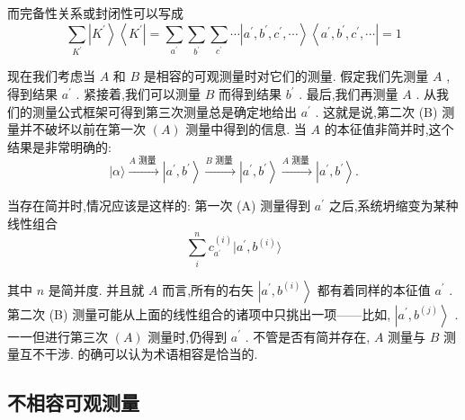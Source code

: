 \documentclass[lang=cn,newtx,10pt,scheme=chinese,thmcnt=section]{elegantbook}
\begin{document}
而完备性关系或封闭性可以写成
\begin{equation}
	\mathop{\sum }\limits_{{K}^{\prime }}\left| {K}^{\prime }\right\rangle \left\langle {K}^{\prime }\right| = \mathop{\sum }\limits_{{a}^{\prime }}\mathop{\sum }\limits_{{b}^{\prime }}\mathop{\sum }\limits_{{c}^{\prime }}\cdots \left| {{a}^{\prime },{b}^{\prime },{c}^{\prime },\cdots }\right\rangle \left\langle {{a}^{\prime },{b}^{\prime },{c}^{\prime },\cdots }\right| = 1
\end{equation}

现在我们考虑当 $A$ 和 $B$ 是相容的可观测量时对它们的测量. 假定我们先测量 $A$ ,得到结果 ${a}^{\prime }$ . 紧接着,我们可以测量 $B$ 而得到结果 ${b}^{\prime }$ . 最后,我们再测量 $A$ . 从我们的测量公式框架可得到第三次测量总是确定地给出 ${a}^{\prime }$ . 这就是说,第二次 (B) 测量并不破坏以前在第一次 $\left( A\right)$ 测量中得到的信息. 当 $A$ 的本征值非简并时,这个结果是非常明确的:
\begin{equation}
	| {\alpha \rangle \xrightarrow[]{A\text{ 测量 }}\left| {{a}^{\prime },{b}^{\prime }}\right\rangle \xrightarrow[]{B\text{ 测量 }}\left| {{a}^{\prime },{b}^{\prime }}\right\rangle \xrightarrow[]{A\text{ 测量 }}\left| {{a}^{\prime },{b}^{\prime }}\right\rangle .}
\end{equation}

当存在简并时,情况应该是这样的: 第一次 (A) 测量得到 ${a}^{\prime }$ 之后,系统坍缩变为某种线性组合
\begin{equation}
	\mathop{\sum }\limits_{i}^{n}{c}_{{a}^{\prime }}^{\left( i\right) }| {{a}^{\prime },{b}^{\left( i\right) }}\rangle
\end{equation}

其中 $n$ 是简并度. 并且就 $A$ 而言,所有的右矢 $\left| {{a}^{\prime },{b}^{\left( i\right) }}\right\rangle$ 都有着同样的本征值 ${a}^{\prime }$ . 第二次 (B) 测量可能从上面的线性组合的诸项中只挑出一项——比如, $\left| {{a}^{\prime },{b}^{\left( j\right) }}\right\rangle$ . 一一但进行第三次 $\left( A\right)$ 测量时,仍得到 ${a}^{\prime }$ . 不管是否有简并存在, $A$ 测量与 $B$ 测量互不干涉. 的确可以认为术语相容是恰当的.

\subsection*{不相容可观测量}
\end{document}
